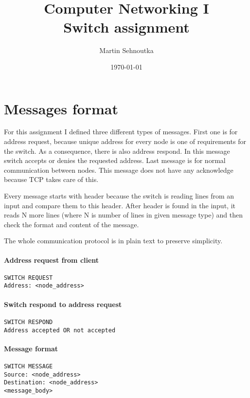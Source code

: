 \documentclass[11pt,a4paper,titlepage]{article}
\title{\blue Computer Networking I \\
\blueb Switch assignment}
\author{Martin Sehnoutka}
\date{\today}
\begin{document}
\maketitle

\tableofcontents

\section{Messages format}

For this assignment I defined three different types of messages. First one is for address request, because unique address for every node is one of requirements for the switch. As a consequence, there is also address respond. In this message switch accepts or denies the requested address. Last message is for normal communication between nodes. This message does not have any acknowledge because TCP takes care of this.

Every message starts with header because the switch is reading lines from an input and compare them to this header. After header is found in the input, it reads N more lines (where N is number of lines in given message type) and then check the format and content of the message.

The whole communication protocol is in plain text to preserve simplicity. 

\paragraph{Address request from client}
\begin{verbatim}
SWITCH REQUEST
Address: <node_address>
\end{verbatim}

\paragraph{Switch respond to address request}
\begin{verbatim}
SWITCH RESPOND
Address accepted OR not accepted
\end{verbatim}

\paragraph{Message format}
\begin{verbatim}
SWITCH MESSAGE
Source: <node_address>
Destination: <node_address>
<message_body>
\end{verbatim}
\end{document}
